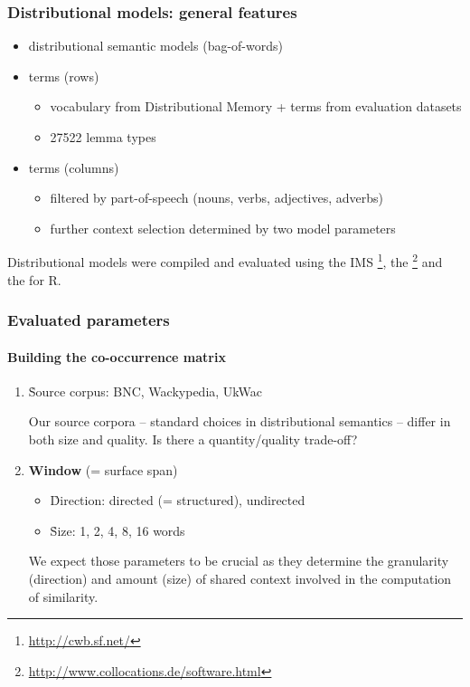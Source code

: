 \documentclass[t]{beamer} %
\begin{document}
\begin{frame}
  \frametitle{Distributional models: general features}
  \begin{itemize}
  \item {} distributional semantic models (bag-of-words)
  \item {} terms (rows)
    \begin{itemize}
    \item vocabulary from Distributional Memory \citep{Baroni:Lenci:10} + terms from evaluation datasets
    \item 27522 lemma types 
    \end{itemize} 
  \item {} terms (columns)
    \begin{itemize}
    \item filtered by part-of-speech (nouns, verbs, adjectives, adverbs)
    \item further context selection determined by two model parameters
    \end{itemize}
  \end{itemize}

  \begin{block}{}\footnotesize
    Distributional models were compiled and evaluated using the IMS \footnote{\scriptsize\url{http://cwb.sf.net/}}, the \footnote{\scriptsize\url{http://www.collocations.de/software.html}} and the  for R.
  \end{block}
\end{frame}

\begin{frame}
  \frametitle{Evaluated parameters}
  \framesubtitle{Building the co-occurrence matrix}
  \begin{enumerate}
  \item   \h{Source corpus}: BNC, Wackypedia, UkWac
    \begin{block}{}\small
      Our source corpora -- standard choices in distributional semantics -- differ in both size and quality. Is there a quantity/quality trade-off?
    \end{block}
    
  \item  \textbf{Window} (= surface span)
    \begin{itemize}
    \item  \h{Direction}: directed (= structured), undirected
    \item  \h{Size}: 1, 2, 4, 8, 16 words
    \end{itemize}   
    
    \begin{block}{}\small
      We expect those parameters to be crucial as they determine the granularity (direction) and amount (size) of shared context involved in the computation of similarity.  
    \end{block}          
  \end{enumerate}   
\end{frame}
\end{document}
